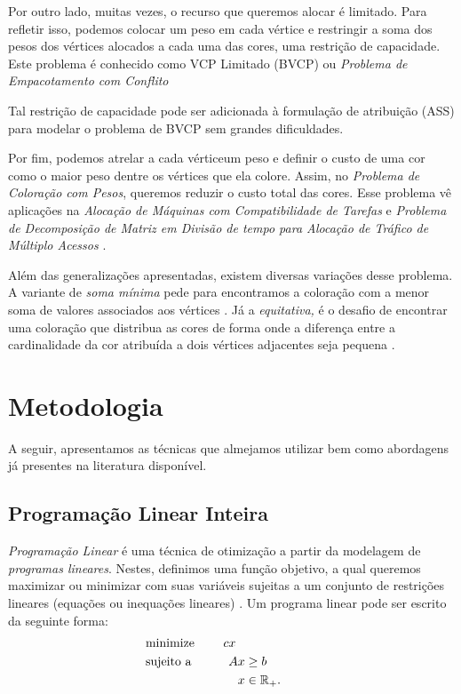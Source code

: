 \documentclass[11pt]{article}
\providecommand{\DIFaddtex}[1]{{\protect\color{blue}{#1}}} %
\providecommand{\DIFaddbegin}{} %
\providecommand{\DIFaddend}{} %
\providecommand{\DIFadd}[1]{\texorpdfstring{\DIFaddtex{#1}}{#1}} %
\newcommand{\DIFaddincludegraphics}[2][]{{\color{blue}\fbox{\DIFOincludegraphics[#1]{#2}}}} %
\DeclareRobustCommand{\DIFaddbegin}{\DIFOaddbegin \let\includegraphics\DIFaddincludegraphics} %
\DeclareRobustCommand{\DIFaddend}{\DIFOaddend \let\includegraphics\DIFOincludegraphics} %
\begin{document}
Por outro lado, muitas vezes, o recurso que queremos alocar é limitado.
Para refletir isso, podemos colocar um peso em cada vértice e restringir a soma dos pesos dos vértices alocados a cada uma das cores, uma restrição de capacidade.
Este problema é conhecido como VCP Limitado (BVCP) ou \emph{Problema de Empacotamento com Conflito}~\autocite{Connolly1990KnapsackProblemsAlgorithms}

Tal restrição de capacidade pode ser adicionada à formulação de atribuição (ASS) para modelar o problema de BVCP sem grandes dificuldades.

Por fim, podemos atrelar a cada vértice\DIFaddbegin \DIFadd{, }\DIFaddend um peso e definir o custo de uma cor como o maior peso dentre os vértices que ela colore.
Assim, no \emph{Problema de Coloração com Pesos}, queremos reduzir o custo total das cores.
Esse problema vê aplicações na \emph{Alocação de Máquinas com Compatibilidade de Tarefas} e \emph{Problema de Decomposição de Matriz em Divisão de tempo para Alocação de Tráfico de Múltiplo Acessos} \autocites{Werra1985introductiontimetabling}[][]{Escoffier2006WeightedColoringfurther}[][]{Finke2008Batchprocessinginterval}.

Além das generalizações apresentadas, existem diversas variações desse problema.
A variante de \emph{soma mínima} pede para encontramos a coloração com a menor soma de valores associados aos vértices \autocite{Jin2016Algorithmsminimumsum}.
Já a \emph{equitativa,} é o desafio de encontrar uma coloração que distribua as cores de forma onde a diferença entre a cardinalidade da cor atribuída a dois vértices adjacentes seja pequena \autocite{Meyer1973EquitableColoring}.

\section{Metodologia}
 \DIFaddbegin \label{sec:orgf04de2b}
\DIFaddend \label{metodologia}
A seguir, apresentamos as técnicas que almejamos utilizar bem como abordagens já presentes na literatura disponível.

\subsection{Programação Linear Inteira}
 \DIFaddbegin \label{sec:orgc6a4f4a}
\DIFaddend \emph{Programação Linear} é uma técnica de otimização a partir da modelagem de \emph{programas lineares}.
Nestes, definimos uma função objetivo, a qual queremos maximizar ou minimizar com suas variáveis sujeitas a um conjunto de restrições lineares (equações ou inequações lineares) \autocite{Chvatal1983LinearProgramming}. Um programa linear pode ser escrito da seguinte forma:
\begin{alignat*}{4}
& \omit\rlap{minimize \quad \quad $\displaystyle cx$} \\
& \mbox{sujeito a}&& \quad & Ax & \geq b  & \quad &  \\
&                 &&       & x               & \in \mathbb{R}_+. &      &
\end{alignat*}
\end{document}

